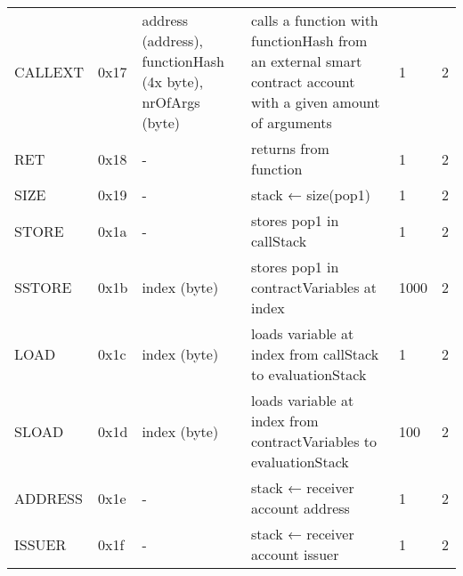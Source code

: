 \begin{longtable}[c]{L{2.5cm} L{1cm} L{3cm} L{5.5cm} R{0.8cm} R{1cm} }
CALLEXT   & 0x17   & address (address), functionHash (4x byte), nrOfArgs (byte) 
	& calls a function with functionHash from an external smart contract account with a given amount of arguments & 1         & 2          \\
RET       & 0x18   & -                                                                                                        & returns from function                                                                                       & 1         & 2          \\
SIZE      & 0x19   & -                                                                                                        & stack ← size(pop1)                                                                                          & 1         & 2          \\
STORE     & 0x1a   & -                                                                                                        & stores pop1 in callStack                                                                                    & 1         & 2          \\
SSTORE    & 0x1b   & index (byte)                                                                                             & stores pop1 in contractVariables at index                                                                   & 1000      & 2          \\
LOAD      & 0x1c   & index (byte)                                                                                             & loads variable at index from callStack to evaluationStack                                                   & 1         & 2          \\
SLOAD     & 0x1d   & index (byte)                                                                                             & loads variable at index from contractVariables to evaluationStack                                           & 100       & 2          \\
ADDRESS   & 0x1e   & -                                                                                                        & stack ← receiver account address                                                                            & 1         & 2          \\
ISSUER    & 0x1f   & -                                                                                                        & stack ← receiver account issuer                                                                             & 1         & 2          \\

\end{longtable}
